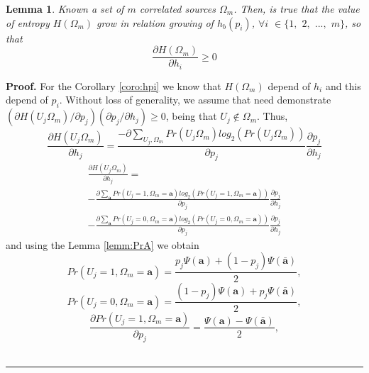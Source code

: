 \documentclass[journal]{IEEEtran}
\newtheorem{lemma}[theorem]{Lemma}
\newenvironment{proof}[1][Proof]{\textbf{#1.} }{\ \rule{0.5em}{0.5em}}
\begin{document}
\begin{lemma}
 \label{lemm:dH}
Known a set of $m$ correlated  sources  $\Omega_m$. Then, is true that
the value of entropy $H(\Omega_m)$ grow in relation growing of $h_b(p_i)$, 
$\forall i$ $\in \{1,$ $2,$ $...,$ $m\}$, so that
\begin{equation}\label{eq:dH1}
 \frac{\partial H(\Omega_m)}{\partial h_i} \geq 0
\end{equation}
\end{lemma}
\begin{proof}
 \label{proof:dH} 
For the Corollary \ref{coro:hpi} we know that $H(\Omega_m)$ depend of $h_i$
and this depend of $p_i$. Without loss of generality, 
we assume that need demonstrate
$({\partial H(U_j\Omega_{m})}/{\partial p_j}) ({\partial p_j}/{\partial h_j}) \geq 0$,
being that $U_j \notin \Omega_{m}$. Thus,
\small
\begin{equation}\label{eq:dH2}
 \frac{\partial H(U_j\Omega_{m})}{\partial h_j} =\frac{-\partial \sum \limits_{U_j,\Omega_{m}} Pr(U_j\Omega_{m}) log_2(Pr(U_j\Omega_{m}))}{\partial p_j}\frac{\partial p_j}{\partial h_j} 
\end{equation}
\normalsize
\begin{equation}\label{eq:dH21}
\begin{matrix}
\frac{\partial H(U_j\Omega_{m})}{\partial h_j} =\\
-\frac{\partial \sum \limits_{\mathbf{a}} Pr(U_j=1,\Omega_{m}=\mathbf{a}) log_2(Pr(U_j=1,\Omega_{m}=\mathbf{a}))}{\partial p_j}\frac{\partial p_j}{\partial h_j}  \\
-\frac{\partial \sum \limits_{\mathbf{a}} Pr(U_j=0,\Omega_{m}=\mathbf{a}) log_2(Pr(U_j=0,\Omega_{m}=\mathbf{a}))}{\partial p_j}\frac{\partial p_j}{\partial h_j}
\end{matrix}
\end{equation}
and using the Lemma \ref{lemm:PrA} we obtain
\begin{equation}\label{eq:dH3}
 Pr(U_j=1,\Omega_{m}=\mathbf{a})=\frac{ p_j\Psi(\mathbf{a}) + (1-p_j)\Psi(\mathbf{\bar{a}}) }{2},
\end{equation}
\begin{equation}\label{eq:dH4}
 Pr(U_j=0,\Omega_{m}=\mathbf{a})=\frac{ (1-p_j)\Psi(\mathbf{a}) + p_j\Psi(\mathbf{\bar{a}}) }{2},
\end{equation}
\begin{equation}\label{eq:dH6}
 \frac{\partial Pr(U_j=1,\Omega_{m}=\mathbf{a})}{\partial p_j}=\frac{ \Psi(\mathbf{a}) -\Psi(\mathbf{\bar{a}}) }{2},

\end{equation}
\end{proof}
\end{document}
